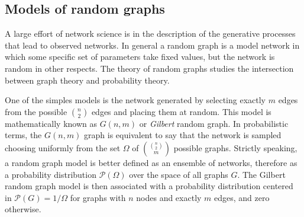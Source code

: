 \subsection{Models of random graphs}

A large effort of network science is in the description of the generative processes that lead to observed networks. In general a random graph is a model network in which some specific set of parameters take fixed values, but the network is random in other respects.
The theory of random graphs studies the intersection between graph theory and probability theory. %

One of the simples models is the network generated by selecting exactly $m$ edges from the possible $\binom{n}{2}$ edges and placing them at random. This model is mathematically known as $G(n,m)$ or \emph{Gilbert} random graph. In probabilistic terms, the $G(n,m)$ graph is equivalent to say that the network is sampled choosing uniformly from the set $\Omega$ of $\binom{\binom{n}{2}}{m}$ possible graphs. Strictly speaking, a random graph model is better defined as an ensemble of networks, therefore as a probability distribution $\mathcal{P}(\Omega)$ over the space of all graphs $G$. The Gilbert random graph model is then associated with a probability distribution centered in $\mathcal{P}(G)=1/\Omega$ for graphs with $n$ nodes and exactly $m$ edges, and zero otherwise.

